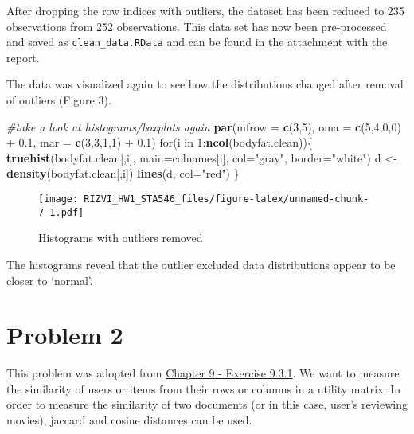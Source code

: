 \documentclass[]{article}
\newenvironment{Shaded}{\begin{snugshade}}{\end{snugshade}}
\newcommand{\KeywordTok}[1]{\textcolor[rgb]{0.13,0.29,0.53}{\textbf{{#1}}}}
\newcommand{\DataTypeTok}[1]{\textcolor[rgb]{0.13,0.29,0.53}{{#1}}}
\newcommand{\DecValTok}[1]{\textcolor[rgb]{0.00,0.00,0.81}{{#1}}}
\newcommand{\FloatTok}[1]{\textcolor[rgb]{0.00,0.00,0.81}{{#1}}}
\newcommand{\StringTok}[1]{\textcolor[rgb]{0.31,0.60,0.02}{{#1}}}
\newcommand{\CommentTok}[1]{\textcolor[rgb]{0.56,0.35,0.01}{\textit{{#1}}}}
\newcommand{\NormalTok}[1]{{#1}}
\begin{document}
After dropping the row indices with outliers, the dataset has been
reduced to 235 observations from 252 observations. This data set has now
been pre-processed and saved as \texttt{clean\_data.RData} and can be
found in the attachment with the report.

The data was visualized again to see how the distributions changed after
removal of outliers (Figure 3).

\begin{Shaded}
\begin{Highlighting}[]
\CommentTok{#take a look at histograms/boxplots again}
\KeywordTok{par}\NormalTok{(}\DataTypeTok{mfrow =} \KeywordTok{c}\NormalTok{(}\DecValTok{3}\NormalTok{,}\DecValTok{5}\NormalTok{),}
          \DataTypeTok{oma =} \KeywordTok{c}\NormalTok{(}\DecValTok{5}\NormalTok{,}\DecValTok{4}\NormalTok{,}\DecValTok{0}\NormalTok{,}\DecValTok{0}\NormalTok{) +}\StringTok{ }\FloatTok{0.1}\NormalTok{,}
          \DataTypeTok{mar =} \KeywordTok{c}\NormalTok{(}\DecValTok{3}\NormalTok{,}\DecValTok{3}\NormalTok{,}\DecValTok{1}\NormalTok{,}\DecValTok{1}\NormalTok{) +}\StringTok{ }\FloatTok{0.1}\NormalTok{)}
\NormalTok{for(i in }\DecValTok{1}\NormalTok{:}\KeywordTok{ncol}\NormalTok{(bodyfat.clean))\{}
        \KeywordTok{truehist}\NormalTok{(bodyfat.clean[,i], }\DataTypeTok{main=}\NormalTok{colnames[i], }\DataTypeTok{col=}\StringTok{"gray"}\NormalTok{, }\DataTypeTok{border=}\StringTok{"white"}\NormalTok{)}
        \NormalTok{d <-}\StringTok{ }\KeywordTok{density}\NormalTok{(bodyfat.clean[,i])}
        \KeywordTok{lines}\NormalTok{(d, }\DataTypeTok{col=}\StringTok{"red"}\NormalTok{)}
\NormalTok{\}}
\end{Highlighting}
\end{Shaded}

\begin{figure}[htbp]
\centering
\texttt{[image: RIZVI\_HW1\_STA546\_files/figure-latex/unnamed-chunk-7-1.pdf]}
\caption{Histograms with outliers removed}
\end{figure}

The histograms reveal that the outlier excluded data distributions
appear to be closer to `normal'.

\section{Problem 2}\label{problem-2}

This problem was adopted from
\href{http://infolab.stanford.edu/~ullman/mmds/ch9.pdf}{Chapter 9 -
Exercise 9.3.1}. We want to measure the similarity of users or items
from their rows or columns in a utility matrix. In order to measure the
similarity of two documents (or in this case, user's reviewing movies),
jaccard and cosine distances can be used.
\end{document}
